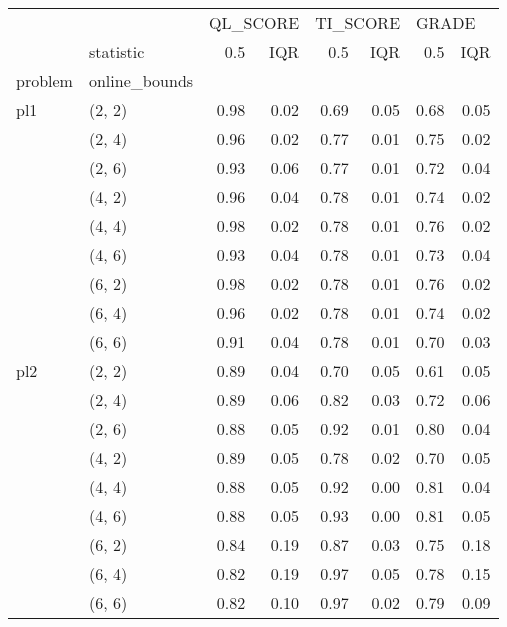 \begin{tabular}{llrrrrrr}
\toprule
    & {} & \multicolumn{2}{l}{QL\_SCORE} & \multicolumn{2}{l}{TI\_SCORE} & \multicolumn{2}{l}{GRADE} \\
    & statistic &      0.5 &  IQR &      0.5 &  IQR &   0.5 &  IQR \\
problem & online\_bounds &          &      &          &      &       &      \\
\midrule
pl1 & (2, 2) &     0.98 & 0.02 &     0.69 & 0.05 &  0.68 & 0.05 \\
    & (2, 4) &     0.96 & 0.02 &     0.77 & 0.01 &  0.75 & 0.02 \\
    & (2, 6) &     0.93 & 0.06 &     0.77 & 0.01 &  0.72 & 0.04 \\
    & (4, 2) &     0.96 & 0.04 &     0.78 & 0.01 &  0.74 & 0.02 \\
    & (4, 4) &     0.98 & 0.02 &     0.78 & 0.01 &  0.76 & 0.02 \\
    & (4, 6) &     0.93 & 0.04 &     0.78 & 0.01 &  0.73 & 0.04 \\
    & (6, 2) &     0.98 & 0.02 &     0.78 & 0.01 &  0.76 & 0.02 \\
    & (6, 4) &     0.96 & 0.02 &     0.78 & 0.01 &  0.74 & 0.02 \\
    & (6, 6) &     0.91 & 0.04 &     0.78 & 0.01 &  0.70 & 0.03 \\
pl2 & (2, 2) &     0.89 & 0.04 &     0.70 & 0.05 &  0.61 & 0.05 \\
    & (2, 4) &     0.89 & 0.06 &     0.82 & 0.03 &  0.72 & 0.06 \\
    & (2, 6) &     0.88 & 0.05 &     0.92 & 0.01 &  0.80 & 0.04 \\
    & (4, 2) &     0.89 & 0.05 &     0.78 & 0.02 &  0.70 & 0.05 \\
    & (4, 4) &     0.88 & 0.05 &     0.92 & 0.00 &  0.81 & 0.04 \\
    & (4, 6) &     0.88 & 0.05 &     0.93 & 0.00 &  0.81 & 0.05 \\
    & (6, 2) &     0.84 & 0.19 &     0.87 & 0.03 &  0.75 & 0.18 \\
    & (6, 4) &     0.82 & 0.19 &     0.97 & 0.05 &  0.78 & 0.15 \\
    & (6, 6) &     0.82 & 0.10 &     0.97 & 0.02 &  0.79 & 0.09 \\
\bottomrule
\end{tabular}
